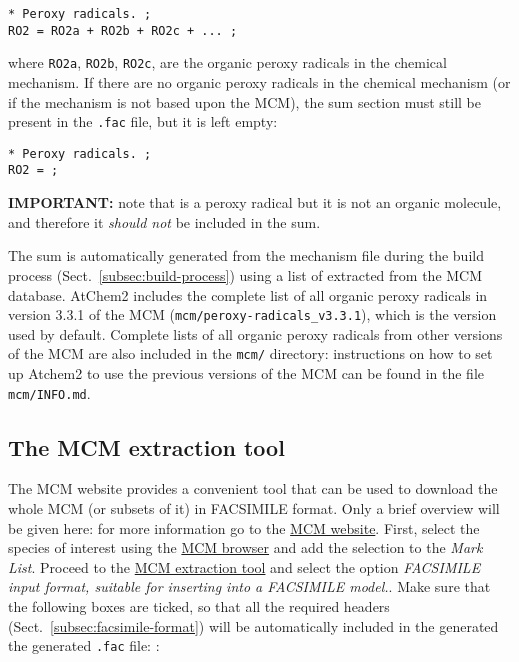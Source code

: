 \begin{verbatim}
* Peroxy radicals. ;
RO2 = RO2a + RO2b + RO2c + ... ;
\end{verbatim}

where \texttt{RO2a}, \texttt{RO2b}, \texttt{RO2c}, are the organic
peroxy radicals in the chemical mechanism. If there are no organic
peroxy radicals in the chemical mechanism (or if the mechanism is not
based upon the MCM), the  sum section must still be present in
the \texttt{.fac} file, but it is left empty:

\begin{verbatim}
* Peroxy radicals. ;
RO2 = ;
\end{verbatim}

\textbf{IMPORTANT:} note that  is a peroxy radical but it is
not an organic molecule, and therefore it \emph{should not} be
included in the  sum.

The  sum is automatically generated from the mechanism file
during the build process (Sect.~\ref{subsec:build-process}) using a
list of  extracted from the MCM database. AtChem2 includes the
complete list of all organic peroxy radicals in version 3.3.1 of the
MCM (\texttt{mcm/peroxy-radicals\_v3.3.1}), which is the version used
by default. Complete lists of all organic peroxy radicals from other
versions of the MCM are also included in the \texttt{mcm/} directory:
instructions on how to set up Atchem2 to use the previous versions of
the MCM can be found in the file \texttt{mcm/INFO.md}.

\subsection{The MCM extraction tool} \label{subsec:mcm-extraction-tool}

The MCM website provides a convenient tool that can be used to
download the whole MCM (or subsets of it) in FACSIMILE
format. Only a brief overview will be given here: for more information
go to the \href{http://mcm.leeds.ac.uk/}{MCM website}. First, select
the species of interest using the \href{http://mcm.leeds.ac.uk/MCM/roots.htt}{MCM browser}
and add the selection to the \emph{Mark List}. Proceed to the
\href{http://mcm.leeds.ac.uk/MCM/extract.htt}{MCM extraction tool}
and select the option \emph{FACSIMILE input format, suitable for
  inserting into a FACSIMILE model.}. Make sure that the following
boxes are ticked, so that all the required headers
(Sect.~\ref{subsec:facsimile-format}) will be automatically included
in the generated the generated \texttt{.fac} file: :

